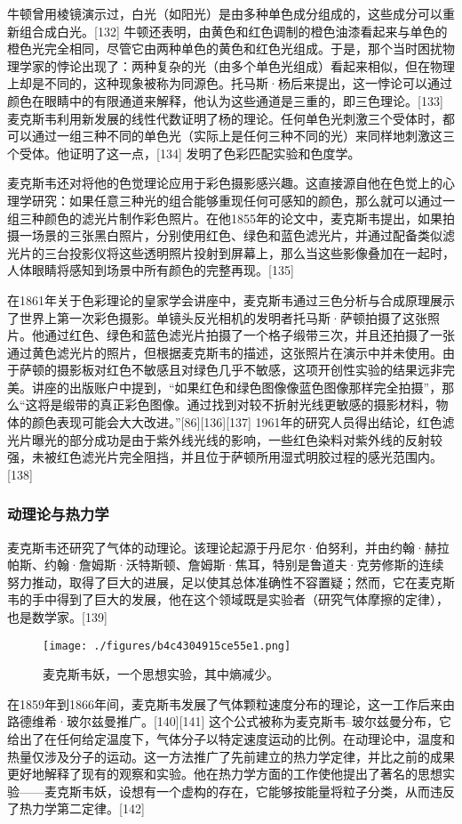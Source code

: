 牛顿曾用棱镜演示过，白光（如阳光）是由多种单色成分组成的，这些成分可以重新组合成白光。[132] 牛顿还表明，由黄色和红色调制的橙色油漆看起来与单色的橙色光完全相同，尽管它由两种单色的黄色和红色光组成。于是，那个当时困扰物理学家的悖论出现了：两种复杂的光（由多个单色光组成）看起来相似，但在物理上却是不同的，这种现象被称为同源色。托马斯·杨后来提出，这一悖论可以通过颜色在眼睛中的有限通道来解释，他认为这些通道是三重的，即三色理论。[133] 麦克斯韦利用新发展的线性代数证明了杨的理论。任何单色光刺激三个受体时，都可以通过一组三种不同的单色光（实际上是任何三种不同的光）来同样地刺激这三个受体。他证明了这一点，[134] 发明了色彩匹配实验和色度学。

麦克斯韦还对将他的色觉理论应用于彩色摄影感兴趣。这直接源自他在色觉上的心理学研究：如果任意三种光的组合能够重现任何可感知的颜色，那么就可以通过一组三种颜色的滤光片制作彩色照片。在他1855年的论文中，麦克斯韦提出，如果拍摄一场景的三张黑白照片，分别使用红色、绿色和蓝色滤光片，并通过配备类似滤光片的三台投影仪将这些透明照片投射到屏幕上，那么当这些影像叠加在一起时，人体眼睛将感知到场景中所有颜色的完整再现。[135]

在1861年关于色彩理论的皇家学会讲座中，麦克斯韦通过三色分析与合成原理展示了世界上第一次彩色摄影。单镜头反光相机的发明者托马斯·萨顿拍摄了这张照片。他通过红色、绿色和蓝色滤光片拍摄了一个格子缎带三次，并且还拍摄了一张通过黄色滤光片的照片，但根据麦克斯韦的描述，这张照片在演示中并未使用。由于萨顿的摄影板对红色不敏感且对绿色几乎不敏感，这项开创性实验的结果远非完美。讲座的出版账户中提到，“如果红色和绿色图像像蓝色图像那样完全拍摄”，那么“这将是缎带的真正彩色图像。通过找到对较不折射光线更敏感的摄影材料，物体的颜色表现可能会大大改进。”[86][136][137] 1961年的研究人员得出结论，红色滤光片曝光的部分成功是由于紫外线光线的影响，一些红色染料对紫外线的反射较强，未被红色滤光片完全阻挡，并且位于萨顿所用湿式明胶过程的感光范围内。[138]
\subsubsection{动理论与热力学}
麦克斯韦还研究了气体的动理论。该理论起源于丹尼尔·伯努利，并由约翰·赫拉帕斯、约翰·詹姆斯·沃特斯顿、詹姆斯·焦耳，特别是鲁道夫·克劳修斯的连续努力推动，取得了巨大的进展，足以使其总体准确性不容置疑；然而，它在麦克斯韦的手中得到了巨大的发展，他在这个领域既是实验者（研究气体摩擦的定律），也是数学家。[139]
\begin{figure}[ht]
\centering
\texttt{[image: ./figures/b4c4304915ce55e1.png]}
\caption{麦克斯韦妖，一个思想实验，其中熵减少。} \label{fig_Clerk_12}
\end{figure}
在1859年到1866年间，麦克斯韦发展了气体颗粒速度分布的理论，这一工作后来由路德维希·玻尔兹曼推广。[140][141] 这个公式被称为麦克斯韦–玻尔兹曼分布，它给出了在任何给定温度下，气体分子以特定速度运动的比例。在动理论中，温度和热量仅涉及分子的运动。这一方法推广了先前建立的热力学定律，并比之前的成果更好地解释了现有的观察和实验。他在热力学方面的工作使他提出了著名的思想实验——麦克斯韦妖，设想有一个虚构的存在，它能够按能量将粒子分类，从而违反了热力学第二定律。[142]

